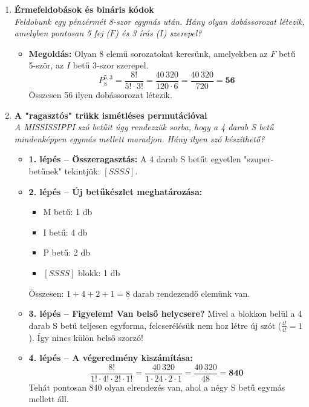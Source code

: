 \documentclass[11pt, a4paper]{article}
\begin{document}
\begin{enumerate}[label=\arabic*., leftmargin=*]
    \vspace{0.4cm}

    \item \textbf{Érmefeldobások és bináris kódok}\\
    \textit{Feldobunk egy pénzérmét 8-szor egymás után. Hány olyan dobássorozat létezik, amelyben pontosan 5 fej ($F$) és 3 írás ($I$) szerepel?}
    \begin{itemize}
        \item \textbf{Megoldás:} Olyan 8 elemű sorozatokat keresünk, amelyekben az $F$ betű 5-ször, az $I$ betű 3-szor szerepel.
        \[
        P_8^{5, 3} = \frac{8!}{5! \cdot 3!} = \frac{40\,320}{120 \cdot 6} = \frac{40\,320}{720} = \mathbf{56}
        \]
        Összesen 56 ilyen dobássorozat létezik.
    \end{itemize}

    \vspace{0.5cm}

    \item \textbf{A "ragasztós" trükk ismétléses permutációval}\\
    \textit{A MISSISSIPPI szó betűit úgy rendezzük sorba, hogy a 4 darab S betű mindenképpen egymás mellett maradjon. Hány ilyen szó készíthető?}
    \begin{itemize}
        \item \textbf{1. lépés – Összeragasztás:} A 4 darab S betűt egyetlen "szuper-betűnek" tekintjük: $[SSSS]$.
        \item \textbf{2. lépés – Új betűkészlet meghatározása:}
        \begin{itemize}
            \item M betű: 1 db
            \item I betű: 4 db
            \item P betű: 2 db
            \item $[SSSS]$ blokk: 1 db
        \end{itemize}
        Összesen: $1 + 4 + 2 + 1 = 8$ darab rendezendő elemünk van.
        \item \textbf{3. lépés – Figyelem! Van belső helycsere?}
        Mivel a blokkon belül a 4 darab S betű teljesen egyforma, felcserélésük nem hoz létre új szót ($\frac{4!}{4!} = 1$). Így nincs külön belső szorzó!
        \item \textbf{4. lépés – A végeredmény kiszámítása:}
        \[
        \frac{8!}{1! \cdot 4! \cdot 2! \cdot 1!} = \frac{40\,320}{1 \cdot 24 \cdot 2 \cdot 1} = \frac{40\,320}{48} = \mathbf{840}
        \]
        Tehát pontosan 840 olyan elrendezés van, ahol a négy S betű egymás mellett áll.
    \end{itemize}


\end{enumerate}
\end{document}
